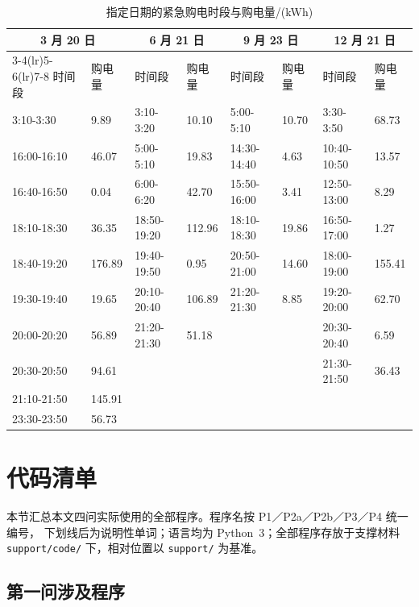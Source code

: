 \documentclass[zihao=-4,a4paper,fontset=none]{ctexart}
\begin{document}
\begin{table}[htbp]
\centering
\caption{指定日期的紧急购电时段与购电量/(kWh)}
{\footnotesize
\begin{tabular}{llllllll}
\toprule
\multicolumn{2}{c}{3 月 20 日} & \multicolumn{2}{c}{6 月 21 日}
& \multicolumn{2}{c}{9 月 23 日} & \multicolumn{2}{c}{12 月 21 日} \\\cmidrule(lr){3-4}\cmidrule(lr){5-6}\cmidrule(lr){7-8}
时间段 & 购电量 & 时间段 & 购电量 & 时间段 & 购电量 & 时间段 & 购电量 \\
\midrule
3:10-3:30 & 9.89 & 3:10-3:20 & 10.10 & 5:00-5:10 & 10.70 & 3:30-3:50 & 68.73 \\
16:00-16:10 & 46.07 & 5:00-5:10 & 19.83 & 14:30-14:40 & 4.63 & 10:40-10:50 & 13.57 \\
16:40-16:50 & 0.04 & 6:00-6:20 & 42.70 & 15:50-16:00 & 3.41 & 12:50-13:00 & 8.29 \\
18:10-18:30 & 36.35 & 18:50-19:20 & 112.96 & 18:10-18:30 & 19.86 & 16:50-17:00 & 1.27 \\
18:40-19:20 & 176.89 & 19:40-19:50 & 0.95 & 20:50-21:00 & 14.60 & 18:00-19:00 & 155.41 \\
19:30-19:40 & 19.65 & 20:10-20:40 & 106.89 & 21:20-21:30 & 8.85 & 19:20-20:00 & 62.70 \\
20:00-20:20 & 56.89 & 21:20-21:30 & 51.18 & & & 20:30-20:40 & 6.59 \\
20:30-20:50 & 94.61 & & & & & 21:30-21:50 & 36.43 \\
21:10-21:50 & 145.91 & & & & & & \\
23:30-23:50 & 56.73 & & & & & & \\
\bottomrule
\end{tabular}}
\label{tab:p3day3}
\end{table}
\newpage
\section{代码清单}

本节汇总本文四问实际使用的全部程序。程序名按 P1／P2a／P2b／P3／P4 统一编号，
下划线后为说明性单词；语言均为 Python~3；全部程序存放于支撑材料 \texttt{support/code/}
下，相对位置以 \texttt{support/} 为基准。

\subsection{第一问涉及程序}
\end{document}
